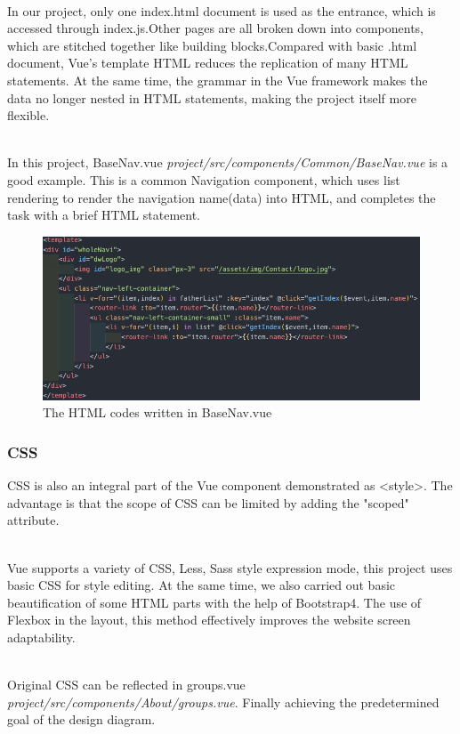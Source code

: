 \documentclass{article}
\begin{document}
~\\
\noindent
In our project, only one index.html document is used as the entrance, which is 
accessed through index.js.Other pages are all broken down into components, 
which are stitched together like building blocks.Compared with basic .html 
document, Vue's template HTML reduces the replication of many HTML statements. 
At the same time, the grammar in the Vue framework makes the data no longer 
nested in HTML statements, making the project itself more flexible.

~\\
\noindent
In this project, BaseNav.vue \textit{project/src/components/Common/BaseNav.vue}
is a good example. This is a common Navigation component, which uses list 
rendering to render the navigation name(data) into HTML, and completes 
the task with a brief HTML statement.

\begin{figure}[h]
    \centering
    \includegraphics[width=13cm]{img/exp/html.png}
    \caption{The HTML codes written in BaseNav.vue}
    \label{}
\end{figure}
\subsubsection{CSS}
CSS is also an integral part of the Vue component demonstrated 
as \textless style\textgreater. The advantage is that the scope of CSS can be 
limited by adding the "scoped" attribute.

~\\
\noindent
Vue supports a variety of CSS, Less, Sass style expression mode, 
this project uses basic CSS for style editing. At the same time, 
we also carried out basic beautification of some HTML parts with 
the help of Bootstrap4. The use of Flexbox in the layout, 
this method effectively improves the website screen adaptability.

~\\
\noindent
Original CSS  can be reflected in groups.vue
\textit{project/src/components/About/groups.vue}. 
Finally achieving the 
predetermined goal of the design diagram.
\end{document}
